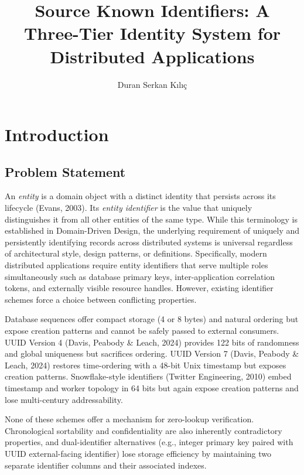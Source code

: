 \documentclass[fleqn,10pt]{wlpeerj}
\title{Source Known Identifiers: A Three-Tier Identity System for
Distributed Applications}
\author[1]{Duran Serkan Kılıç}
\affil[1]{Independent Researcher, Ankara, Türkiye}
\begin{document}
\flushbottom
\maketitle
\thispagestyle{empty}

\newpage

\section{Introduction}\label{introduction}

\subsection{Problem Statement}\label{problem-statement}

An \emph{entity} is a domain object with a distinct identity that
persists across its lifecycle (Evans, 2003). Its \emph{entity
identifier} is the value that uniquely distinguishes it from all other
entities of the same type. While this terminology is established in
Domain-Driven Design, the underlying requirement of uniquely and
persistently identifying records across distributed systems is universal
regardless of architectural style, design patterns, or definitions.
Specifically, modern distributed applications require entity identifiers
that serve multiple roles simultaneously such as database primary keys,
inter-application correlation tokens, and externally visible resource
handles. However, existing identifier schemes force a choice between
conflicting properties.

Database sequences offer compact storage (4 or 8 bytes) and natural
ordering but expose creation patterns and cannot be safely passed to
external consumers. UUID Version 4 (Davis, Peabody \& Leach, 2024)
provides 122 bits of randomness and global uniqueness but sacrifices
ordering. UUID Version 7 (Davis, Peabody \& Leach, 2024) restores
time-ordering with a 48-bit Unix timestamp but exposes creation
patterns. Snowflake-style identifiers (Twitter Engineering, 2010) embed
timestamp and worker topology in 64 bits but again expose creation
patterns and lose multi-century addressability.

None of these schemes offer a mechanism for zero-lookup verification.
Chronological sortability and confidentiality are also inherently
contradictory properties, and dual-identifier alternatives (e.g.,
integer primary key paired with UUID external-facing identifier) lose
storage efficiency by maintaining two separate identifier columns and
their associated indexes.
\end{document}
